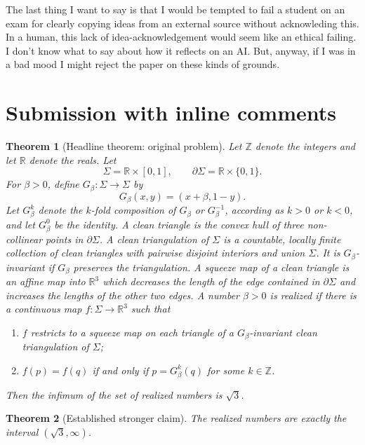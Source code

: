 \documentclass[12pt]{article}
\newcommand{\R}{\mathbb R}
\newcommand{\Z}{\mathbb Z}
\theoremstyle{plain}
\newtheorem{theorem}{Theorem}
\begin{document}
The last thing I want to say is that I would be tempted to fail a student on an exam for clearly copying ideas from an external source without acknowleding this.   In a human, this lack of idea-acknowledgement would seem like an ethical failing. I don't know what to say about how it reflects on an AI.  But, anyway, if I was in a bad mood I might reject the paper on these kinds of grounds.

  \section{Submission with inline comments}



\date{}


\begin{theorem}[Headline theorem: original problem]\label{thm:headline}
\normalfont
Let \(\Z\) denote the integers and let \(\R\) denote the reals.  Let
\[
\Sigma=\R\times[0,1],\qquad \partial\Sigma=\R\times\{0,1\}.
\]
For \(\beta>0\), define \(G_\beta:\Sigma\to\Sigma\) by
\[
G_\beta(x,y)=(x+\beta,1-y).
\]
Let \(G_\beta^k\) denote the \(k\)-fold composition of \(G_\beta\) or
\(G_\beta^{-1}\), according as \(k>0\) or \(k<0\), and let
\(G_\beta^0\) be the identity.  A \emph{clean triangle} is the convex hull of
three non-collinear points in \(\partial\Sigma\).  A \emph{clean triangulation}
of \(\Sigma\) is a countable, locally finite collection of clean triangles
with pairwise disjoint interiors and union \(\Sigma\).  It is
\(G_\beta\)-\emph{invariant} if \(G_\beta\) preserves the triangulation.  A
\emph{squeeze map} of a clean triangle is an affine map into \(\R^3\) which
decreases the length of the edge contained in \(\partial\Sigma\) and increases
the lengths of the other two edges.  A number \(\beta>0\) is \emph{realized}
if there is a continuous map \(f:\Sigma\to\R^3\) such that
\begin{enumerate}
\item \(f\) restricts to a squeeze map on each triangle of a
\(G_\beta\)-invariant clean triangulation of \(\Sigma\);
\item \(f(p)=f(q)\) if and only if \(p=G_\beta^k(q)\) for some \(k\in\Z\).
\end{enumerate}
Then the infimum of the set of realized numbers is \(\sqrt3\).
\end{theorem}

\begin{theorem}[Established stronger claim]\label{thm:strong}
The realized numbers are exactly the interval \((\sqrt3,\infty)\).
\end{theorem}
\end{document}
